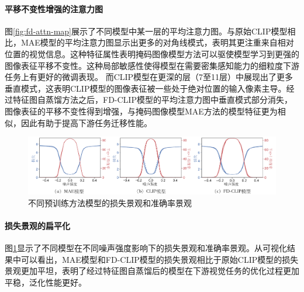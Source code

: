 \paragraph{平移不变性增强的注意力图} 图\ref{fig:fd-attn-map}展示了不同模型中某一层的平均注意力图。与原始CLIP模型相比，MAE模型的平均注意力图显示出更多的对角线模式，表明其更注重来自相对位置的视觉信息。这种特征属性表明掩码图像模型方法可以驱使模型学习到更强的图像表征平移不变性。这种局部敏感性使得模型在需要密集感知能力的细粒度下游任务上有更好的微调表现。
而CLIP模型在更深的层（7至11层）中展现出了更多垂直模式，这表明CLIP模型的图像表征被一些处于绝对位置的输入像素主导。经过特征图自蒸馏方法之后，FD-CLIP模型的平均注意力图中垂直模式部分消失，图像表征的平移不变性得到增强，与掩码图像模型MAE方法的模型特征更为相似，因此有助于提高下游任务迁移性能。

\begin{figure}
  \centering
  \includegraphics[width=1.0\linewidth]{figures/fd-loss-landscape.pdf}
  \caption{不同预训练方法模型的损失景观和准确率景观}
  \label{fig:fd-loss-landscape}
\end{figure}

\paragraph{损失景观的扁平化} 图\ref{fig:fd-loss-landscape}显示了不同模型在不同噪声强度影响下的损失景观和准确率景观\cite{li2018visualizing}。从可视化结果中可以看出，MAE模型和FD-CLIP模型的损失景观相比于原始CLIP模型的损失景观更加平坦，表明了经过特征图自蒸馏后的模型在下游视觉任务的优化过程更加平稳，泛化性能更好。%




